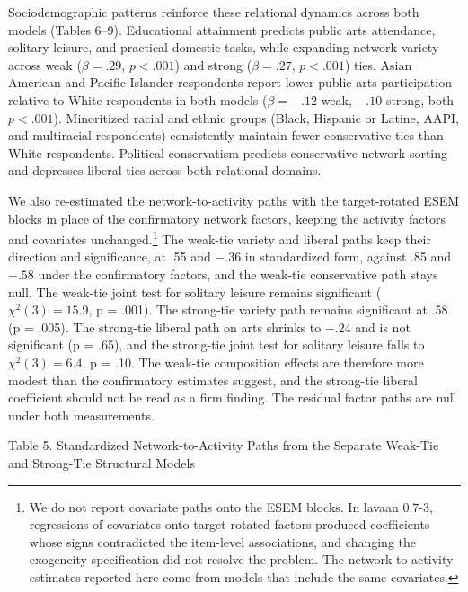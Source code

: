 \documentclass[
  12pt
]{article}
\begin{document}
Sociodemographic patterns reinforce these relational dynamics across both models (Tables 6--9). Educational attainment predicts public arts attendance, solitary leisure, and practical domestic tasks, while expanding network variety across weak ($\beta = .29$, $p < .001$) and strong ($\beta = .27$, $p < .001$) ties. Asian American and Pacific Islander respondents report lower public arts participation relative to White respondents in both models ($\beta = -.12$ weak, $-.10$ strong, both $p < .001$). Minoritized racial and ethnic groups (Black, Hispanic or Latine, AAPI, and multiracial respondents) consistently maintain fewer conservative ties than White respondents. Political conservatism predicts conservative network sorting and depresses liberal ties across both relational domains.

We also re-estimated the network-to-activity paths with the target-rotated ESEM blocks in place of the confirmatory network factors, keeping the activity factors and covariates unchanged.\footnote{We do not report covariate paths onto the ESEM blocks. In lavaan 0.7-3, regressions of covariates onto target-rotated factors produced coefficients whose signs contradicted the item-level associations, and changing the exogeneity specification did not resolve the problem. The network-to-activity estimates reported here come from models that include the same covariates.} The weak-tie variety and liberal paths keep their direction and significance, at .55 and $-.36$ in standardized form, against .85 and $-.58$ under the confirmatory factors, and the weak-tie conservative path stays null. The weak-tie joint test for solitary leisure remains significant ($\chi^2(3) = 15.9$, p = .001). The strong-tie variety path remains significant at .58 (p = .005). The strong-tie liberal path on arts shrinks to $-.24$ and is not significant (p = .65), and the strong-tie joint test for solitary leisure falls to $\chi^2(3) = 6.4$, p = .10. The weak-tie composition effects are therefore more modest than the confirmatory estimates suggest, and the strong-tie liberal coefficient should not be read as a firm finding. The residual factor paths are null under both measurements.

Table 5. Standardized Network-to-Activity Paths from the Separate Weak-Tie and Strong-Tie Structural Models
\end{document}
